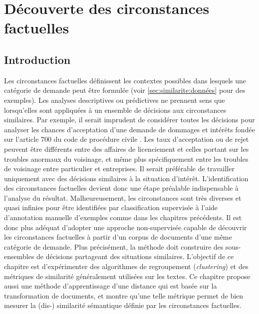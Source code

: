  \chapter{Découverte des circonstances factuelles}
\label{chap:similarite}

\section{Introduction}
\label{sec:similarite:introduction}
Les circonstances factuelles définissent les contextes possibles dans lesquels une catégorie de demande peut être formulée (voir \ref{sec:similarite:données} pour des exemples). Les analyses descriptives ou prédictives ne prennent sens que lorsqu'elles sont appliquées à un ensemble de décisions aux circonstances similaires. Par exemple, il serait imprudent de considérer toutes les décisions pour analyser les chances d'acceptation d'une demande de dommages et intérêts fondée sur l'\og article 700 du code de procédure civile \fg{}. Les taux d'acceptation ou de rejet peuvent être différents entre des affaires de licenciement et celles portant sur les troubles anormaux du voisinage, et même plus spécifiquement entre les troubles de voisinage entre particulier et entreprises. %
 Il serait préférable de travailler uniquement avec des décisions similaires à la situation d'intérêt. L'identification des circonstances factuelles devient donc une étape préalable indispensable à l'analyse du résultat. Malheureusement, les circonstances sont très diverses et quasi infinies pour être identifiées par classification supervisée à l'aide d'annotation manuelle d'exemples comme dans les chapitres précédents. Il est donc plus adéquat d'adopter une approche non-supervisée capable de découvrir les circonstances factuelles à partir d'un corpus de documents d'une même catégorie de demande. Plus précisément, la méthode doit construire des sous-ensembles de décisions partageant des situations similaires.  L'objectif de ce chapitre est d'expérimenter des algorithmes  de regroupement (\textit{clustering}) et des métriques de similarité généralement utilisées sur les textes. Ce chapitre propose aussi une méthode d'apprentissage d'une distance qui est basée sur la transformation de documents, et montre qu'une telle métrique permet de bien mesurer la (dis-) similarité sémantique définie par les circonstances factuelles.


